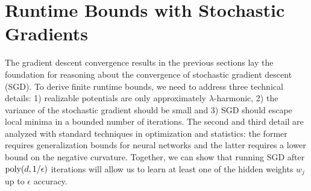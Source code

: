 
\section{Runtime Bounds with Stochastic Gradients}

The gradient descent convergence results in the previous sections lay
the foundation for reasoning about the convergence of stochastic
gradient descent (SGD). To derive finite runtime bounds, we need to
address three technical details: 1) realizable potentials are only
approximately $\lambda$-harmonic, 2) the
variance of the stochastic gradient should be small and 3) SGD should escape local
minima in a bounded number of iterations. The
second and third detail are analyzed with standard techniques in
optimization and statistics: the former requires generalization bounds
for neural networks and the latter requires a lower bound on the
negative curvature. Together, we can show that running SGD after $\mathrm{poly}(d,1/\epsilon)$ iterations will allow us to learn at least one of the hidden weights $w_j$ up to $\epsilon$ accuracy.

